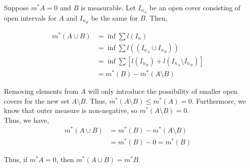 \documentclass[12pt]{article}
\newenvironment{problem}[2][Problem]{\begin{trivlist}
\item[\hskip \labelsep {\bfseries #1}\hskip \labelsep {\bfseries #2.}]}{\end{trivlist}}
\begin{document}
\begin{problem}{4}
\end{problem}

Suppose $m^*A = 0$ and $B$ is measurable. Let $I_{n_A}$ be an open cover consisting of open intervals for $A$ and $I_{n_B}$ be the same for $B$. Then,

\begin{align*}
m^*(A \cup B) &= \inf \sum l(I_n)\\
&= \inf \sum l((I_{n_A} \cup I_{n_B}))\\
&= \inf \sum [l(I_{n_B}) + l(I_{n_A} \setminus I_{n_B})]\\
&= m^*(B) - m^*(A \setminus B)
\end{align*}

Removing elements from $A$ will only introduce the possibility of smaller open covers for the new set $A \setminus B$. Thus, $m^*(A \setminus B) \leq m^*(A) = 0$. Furthermore, we know that outer measure is non-negative, so $m^*(A \setminus B) = 0$.\\

Thus, we have,
\begin{align*}
m^*(A \cup B) &= m^*(B) - m^*(A \setminus B)\\
&= m^*(B) - 0 = m^*(B)
\end{align*}

Thus, if $m^*A = 0$, then $m^*(A \cup B) = m^*B$.
\end{document}
